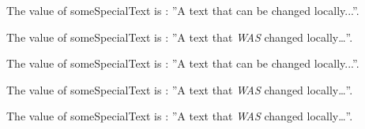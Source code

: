 \documentclass{article}
\newcommand{\someSpecialText}{A text that can be changed locally...}
\newcommand{\testIt}{The value of someSpecialText is : ''\someSpecialText''.}
\begin{document}
\testIt

{%
\renewcommand{\someSpecialText}{A text that \textit{WAS} changed locally\ldots}
\testIt
}%

\testIt

\renewcommand{\someSpecialText}{A text that \textit{WAS} changed locally\ldots}
\testIt

\testIt
\end{document}
